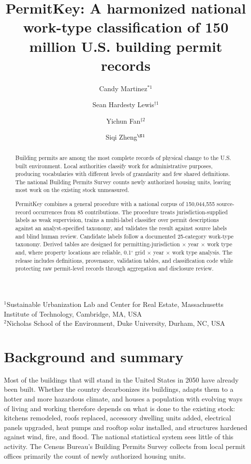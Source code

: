 \documentclass[11pt]{article}
\title{PermitKey: A harmonized national work-type classification of 150 million U.S. building permit records}
\author{Candy Martinez$^{\ast 1}$ \and Sean Hardesty Lewis$^{\dagger 1}$ \and Yichun Fan$^{\ddagger 2}$ \and Siqi Zheng$^{\S 1}$}
\date{}
\begin{document}
\maketitle
\begin{center}
$^{1}$Sustainable Urbanization Lab and Center for Real Estate, Massachusetts Institute of Technology, Cambridge, MA, USA\\
$^{2}$Nicholas School of the Environment, Duke University, Durham, NC, USA
\end{center}

\begin{abstract}
Building permits are among the most complete records of physical change to the U.S. built environment. Local authorities classify work for administrative purposes, producing vocabularies with different levels of granularity and few shared definitions. The national Building Permits Survey counts newly authorized housing units, leaving most work on the existing stock unmeasured.

PermitKey combines a general procedure with a national corpus of 150,044,555 source-record occurrences from 85 contributions. The procedure treats jurisdiction-supplied labels as weak supervision, trains a multi-label classifier over permit descriptions against an analyst-specified taxonomy, and validates the result against source labels and blind human review. Candidate labels follow a documented 25-category work-type taxonomy. Derived tables are designed for permitting-jurisdiction $\times$ year $\times$ work type and, where property locations are reliable, 0.1$^{\circ}$ grid $\times$ year $\times$ work type analysis. The release includes definitions, provenance, validation tables, and classification code while protecting raw permit-level records through aggregation and disclosure review.
\end{abstract}

\section{Background and summary}
Most of the buildings that will stand in the United States in 2050 have already been built. Whether the country decarbonizes its buildings, adapts them to a hotter and more hazardous climate, and houses a population with evolving ways of living and working therefore depends on what is done to the existing stock: kitchens remodeled, roofs replaced, accessory dwelling units added, electrical panels upgraded, heat pumps and rooftop solar installed, and structures hardened against wind, fire, and flood. The national statistical system sees little of this activity. The Census Bureau's Building Permits Survey collects from local permit offices primarily the count of newly authorized housing units.
\end{document}
